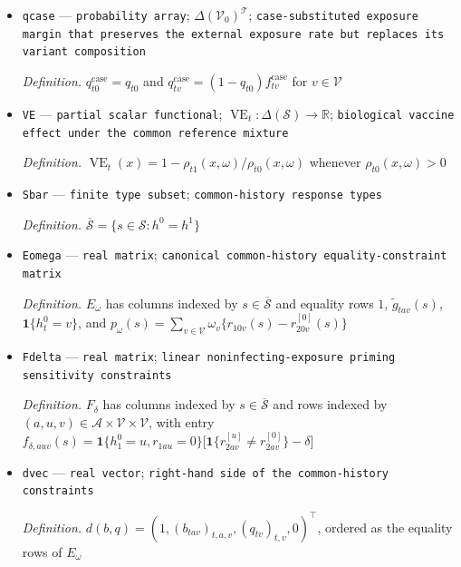 \documentclass{article}
\begin{document}
\begin{itemize}
  \par\smallskip\noindent\emph{Definition.} \(f^{\mathrm{case}}_{tv}=\frac{\sum_{a\in\mathcal A}\pi_a b_{tav}}{\sum_{a\in\mathcal A}\sum_{w\in\mathcal V}\pi_a b_{taw}}\)
  \item \texttt{qcase} --- \texttt{probability array}; \(\Delta(\mathcal V_0)^{\mathcal T}\); \texttt{case-\allowbreak{}substituted exposure margin that preserves the external exposure rate but replaces its variant composition}
  \par\smallskip\noindent\emph{Definition.} \(q^{\mathrm{case}}_{t0}=q_{t0}\) and \(q^{\mathrm{case}}_{tv}=(1-q_{t0})f^{\mathrm{case}}_{tv}\) for \(v\in\mathcal V\)
  \item \texttt{VE} --- \texttt{partial scalar functional}; \(\operatorname{VE}_t:\Delta(\mathcal S)\to\mathbb R\); \texttt{biological vaccine effect under the common reference mixture}
  \par\smallskip\noindent\emph{Definition.} \(\operatorname{VE}_t(x)=1-\rho_{t1}(x,\omega)/\rho_{t0}(x,\omega)\) whenever \(\rho_{t0}(x,\omega)>0\)
  \item \texttt{Sbar} --- \texttt{finite type subset}; \texttt{common-\allowbreak{}history response types}
  \par\smallskip\noindent\emph{Definition.} \(\overline{\mathcal S}=\{s\in\mathcal S:h^0=h^1\}\)
  \item \texttt{Eomega} --- \texttt{real matrix}; \texttt{canonical common-\allowbreak{}history equality-\allowbreak{}constraint matrix}
  \par\smallskip\noindent\emph{Definition.} \(E_\omega\) has columns indexed by \(s\in\overline{\mathcal S}\) and equality rows \(1\), \(\widetilde g_{tav}(s)\), \(\mathbf 1\{h_t^0=v\}\), and \(p_\omega(s)=\sum_{v\in\mathcal V}\omega_v\{r_{10v}(s)-r^{[0]}_{20v}(s)\}\)
  \item \texttt{Fdelta} --- \texttt{real matrix}; \texttt{linear noninfecting-\allowbreak{}exposure priming sensitivity constraints}
  \par\smallskip\noindent\emph{Definition.} \(F_\delta\) has columns indexed by \(s\in\overline{\mathcal S}\) and rows indexed by \((a,u,v)\in\mathcal A\times\mathcal V\times\mathcal V\), with entry \(f_{\delta,auv}(s)=\mathbf 1\{h_1^0=u,r_{1au}=0\}\bigl[\mathbf 1\{r^{[u]}_{2av}\neq r^{[0]}_{2av}\}-\delta\bigr]\)
  \item \texttt{dvec} --- \texttt{real vector}; \texttt{right-\allowbreak{}hand side of the common-\allowbreak{}history constraints}
  \par\smallskip\noindent\emph{Definition.} \(d(b,q)=(1,(b_{tav})_{t,a,v},(q_{tv})_{t,v},0)^{\top}\), ordered as the equality rows of \(E_\omega\)

\end{itemize}
\end{document}
